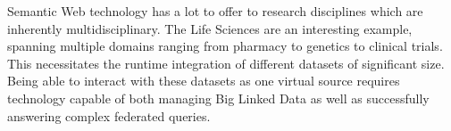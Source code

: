 Semantic Web technology has a lot to offer to research disciplines which are inherently multidisciplinary. The Life Sciences are an interesting example, spanning multiple domains ranging from pharmacy to genetics to clinical trials.
This necessitates the runtime integration of different datasets of significant size. 
Being able to interact with these datasets as one virtual source requires technology capable of both managing Big Linked Data as well as successfully answering complex federated queries.
